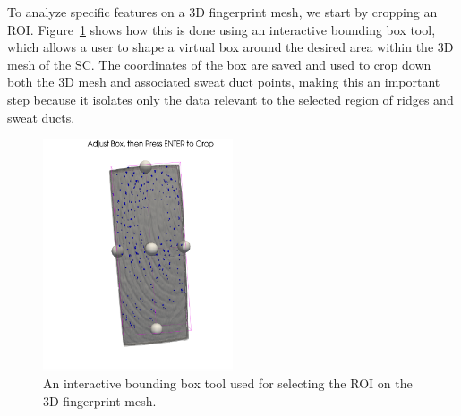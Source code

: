 To analyze specific features on a 3D fingerprint mesh, we start by cropping an ROI. Figure~\ref{fig:boundary_box} shows how this is done using an interactive bounding box tool, which allows a user to shape a virtual box around the desired area within the 3D mesh of the SC. The coordinates of the box are saved and used to crop down both the 3D mesh and associated sweat duct points, making this an important step because it isolates only the data relevant to the selected region of ridges and sweat ducts.
\begin{figure}[h!]
    \centering
    \includegraphics[width=0.5\textwidth]{images/Boundary_Box.png}
    \caption{An interactive bounding box tool used for selecting the ROI on the 3D fingerprint mesh.}
    \label{fig:boundary_box}
\end{figure}

